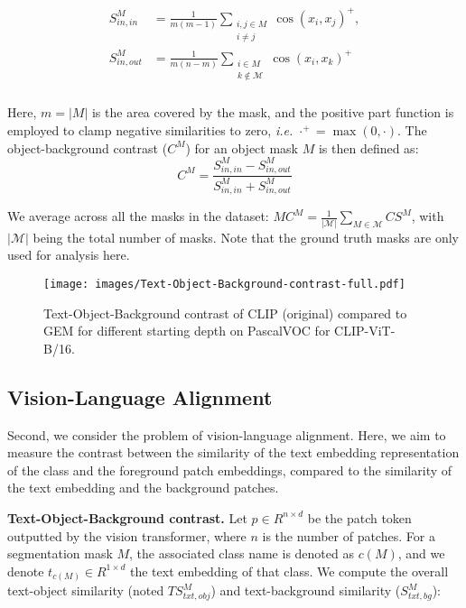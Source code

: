 \documentclass[10pt,twocolumn,letterpaper]{article}
\begin{document}
\begin{equation}
    \begin{aligned}
        S^{M}_{in, in} &= \frac{1}{m(m-1)} \sum\limits_{\substack{i, j \in M \\ i \neq j}} \cos(x_i, x_j)^+, \\
        S^{M}_{in, out} &= \frac{1}{m(n-m)} \sum\limits_{\substack{i\in M \\ k \notin \mathcal{M}}} \cos(x_i, x_k)^+ \\ 
    \end{aligned}
\end{equation}

Here, $m=|M|$ is the area covered by the mask, and the positive part function is employed to clamp negative similarities to zero, \textit{i.e.} $\cdot^+ = \max(0, \cdot)$. The object-background contrast ($C^M$) for an object mask $M$ is then defined as:
\begin{equation}
    C^M = \frac{S^M_{in, in} - S^M_{in, out}}{S^M_{in, in} + S^M_{in, out}}
\end{equation}

We average across all the masks in the dataset: $MC^M = \frac{1}{|\mathcal{M}|} \sum_{M \in \mathcal{M}} CS^M$,
with $|\mathcal{M}|$ being the total number of masks. Note that the ground truth masks are only used for analysis here.


\begin{figure}[t]
\texttt{[image: images/Text-Object-Background-contrast-full.pdf]}
      \vspace{-2em}
     \caption{Text-Object-Background contrast of CLIP (original) compared to GEM for different starting depth on PascalVOC for CLIP-ViT-B/16. }\label{fig:depth_txt_obj_bg_contrast_plots}
     \vspace{-2em}
\end{figure}

\subsection{Vision-Language Alignment} 

Second, we consider the problem of vision-language alignment.
Here, we aim to measure the contrast between the similarity of the text embedding representation of the class and the foreground patch embeddings, compared to the similarity of the text embedding and the background patches.

\noindent \textbf{Text-Object-Background contrast.}
Let $p \in R^{n \times d}$ be the patch token outputted by the vision transformer, where $n$ is the number of patches. For a segmentation mask $M$, the associated class name is denoted as $c(M)$, and we denote $t_{c(M)} \in R^{1 \times d}$ the text embedding of that class.
We compute the overall text-object similarity (noted $TS^M_{txt, obj}$) and text-background similarity ($S^M_{txt, bg}$): 
\end{document}
